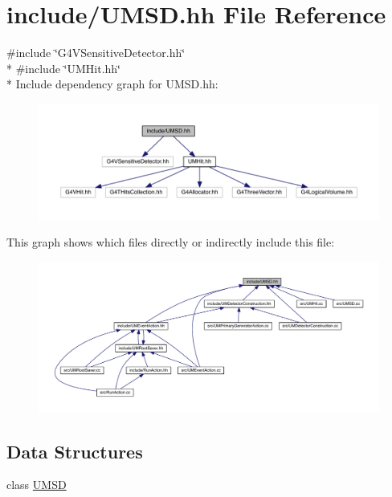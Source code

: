 \hypertarget{UMSD_8hh}{}\section{include/\+U\+M\+S\+D.hh File Reference}
\label{UMSD_8hh}
{\ttfamily \#include \char`\"{}G4\+V\+Sensitive\+Detector.\+hh\char`\"{}}\\*
{\ttfamily \#include \char`\"{}U\+M\+Hit.\+hh\char`\"{}}\\*
Include dependency graph for U\+M\+S\+D.\+hh\+:
\nopagebreak
\begin{figure}[H]
\begin{center}
\leavevmode
\includegraphics[width=350pt]{UMSD_8hh__incl}
\end{center}
\end{figure}
This graph shows which files directly or indirectly include this file\+:
\nopagebreak
\begin{figure}[H]
\begin{center}
\leavevmode
\includegraphics[width=350pt]{UMSD_8hh__dep__incl}
\end{center}
\end{figure}
\subsection*{Data Structures}
\begin{DoxyCompactItemize}
\item 
class \hyperlink{classUMSD}{U\+M\+S\+D}
\end{DoxyCompactItemize}
